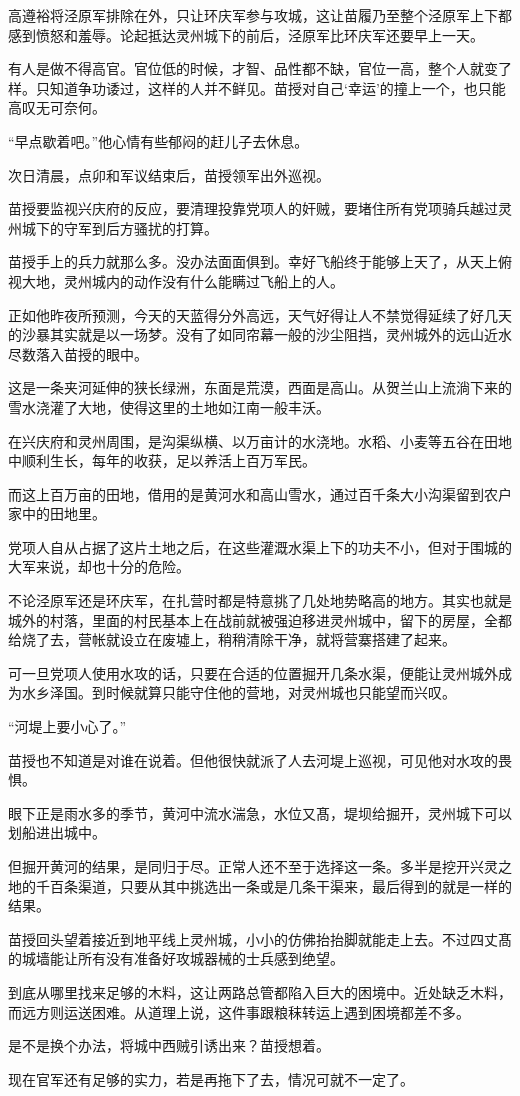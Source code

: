 高遵裕将泾原军排除在外，只让环庆军参与攻城，这让苗履乃至整个泾原军上下都感到愤怒和羞辱。论起抵达灵州城下的前后，泾原军比环庆军还要早上一天。

有人是做不得高官。官位低的时候，才智、品性都不缺，官位一高，整个人就变了样。只知道争功诿过，这样的人并不鲜见。苗授对自己‘幸运’的撞上一个，也只能高叹无可奈何。

“早点歇着吧。”他心情有些郁闷的赶儿子去休息。

次日清晨，点卯和军议结束后，苗授领军出外巡视。

苗授要监视兴庆府的反应，要清理投靠党项人的奸贼，要堵住所有党项骑兵越过灵州城下的守军到后方骚扰的打算。

苗授手上的兵力就那么多。没办法面面俱到。幸好飞船终于能够上天了，从天上俯视大地，灵州城内的动作没有什么能瞒过飞船上的人。

正如他昨夜所预测，今天的天蓝得分外高远，天气好得让人不禁觉得延续了好几天的沙暴其实就是以一场梦。没有了如同帘幕一般的沙尘阻挡，灵州城外的远山近水尽数落入苗授的眼中。

这是一条夹河延伸的狭长绿洲，东面是荒漠，西面是高山。从贺兰山上流淌下来的雪水浇灌了大地，使得这里的土地如江南一般丰沃。

在兴庆府和灵州周围，是沟渠纵横、以万亩计的水浇地。水稻、小麦等五谷在田地中顺利生长，每年的收获，足以养活上百万军民。

而这上百万亩的田地，借用的是黄河水和高山雪水，通过百千条大小沟渠留到农户家中的田地里。

党项人自从占据了这片土地之后，在这些灌溉水渠上下的功夫不小，但对于围城的大军来说，却也十分的危险。

不论泾原军还是环庆军，在扎营时都是特意挑了几处地势略高的地方。其实也就是城外的村落，里面的村民基本上在战前就被强迫移进灵州城中，留下的房屋，全都给烧了去，营帐就设立在废墟上，稍稍清除干净，就将营寨搭建了起来。

可一旦党项人使用水攻的话，只要在合适的位置掘开几条水渠，便能让灵州城外成为水乡泽国。到时候就算只能守住他的营地，对灵州城也只能望而兴叹。

“河堤上要小心了。”

苗授也不知道是对谁在说着。但他很快就派了人去河堤上巡视，可见他对水攻的畏惧。

眼下正是雨水多的季节，黄河中流水湍急，水位又髙，堤坝给掘开，灵州城下可以划船进出城中。

但掘开黄河的结果，是同归于尽。正常人还不至于选择这一条。多半是挖开兴灵之地的千百条渠道，只要从其中挑选出一条或是几条干渠来，最后得到的就是一样的结果。

苗授回头望着接近到地平线上灵州城，小小的仿佛抬抬脚就能走上去。不过四丈髙的城墙能让所有没有准备好攻城器械的士兵感到绝望。

到底从哪里找来足够的木料，这让两路总管都陷入巨大的困境中。近处缺乏木料，而远方则运送困难。从道理上说，这件事跟粮秣转运上遇到困境都差不多。

是不是换个办法，将城中西贼引诱出来？苗授想着。

现在官军还有足够的实力，若是再拖下了去，情况可就不一定了。

